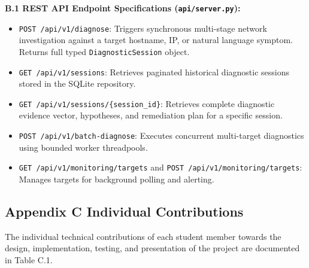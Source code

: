 \documentclass[
]{article}
\providecommand{\tightlist}{%
  \setlength{\itemsep}{0pt}\setlength{\parskip}{0pt}}
\begin{document}
\textbf{B.1 REST API Endpoint Specifications (\texttt{api/server.py}):}
\begin{itemize}
\tightlist
\item \texttt{POST /api/v1/diagnose}: Triggers synchronous multi-stage network investigation against a target hostname, IP, or natural language symptom. Returns full typed \texttt{DiagnosticSession} object.
\item \texttt{GET /api/v1/sessions}: Retrieves paginated historical diagnostic sessions stored in the SQLite repository.
\item \texttt{GET /api/v1/sessions/\{session\_id\}}: Retrieves complete diagnostic evidence vector, hypotheses, and remediation plan for a specific session.
\item \texttt{POST /api/v1/batch-diagnose}: Executes concurrent multi-target diagnostics using bounded worker threadpools.
\item \texttt{GET /api/v1/monitoring/targets} and \texttt{POST /api/v1/monitoring/targets}: Manages targets for background polling and alerting.
\end{itemize}

\subsection{Appendix C Individual Contributions}\label{appendix-c-individual-contributions}

The individual technical contributions of each student member towards the design, implementation, testing, and presentation of the project are documented in Table C.1.
\end{document}
